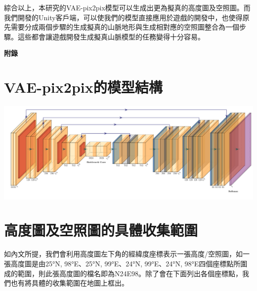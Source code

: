 \documentclass[a4paper, 12pt]{article}
\begin{document}
綜合以上，本研究的VAE-pix2pix模型可以生成出更為擬真的高度圖及空照圖。而我們開發的Unity客戶端，可以使我們的模型直接應用於遊戲的開發中，也使得原先需要分成兩個步驟的生成擬真的山脈地形與生成相對應的空照圖整合為一個步驟。這些都會讓遊戲開發生成擬真山脈模型的任務變得十分容易。

\nocite{*}
\printbibliography[title={參考文獻}]



\newpage
\begin{appendices}

    \begin{center}
        \Huge \textbf{附錄}
    \end{center}

    \section{VAE-pix2pix的模型結構}
    \begin{center}
        \includegraphics[width=\textwidth]{fig/Unet.pdf}
    \end{center}

    \section{高度圖及空照圖的具體收集範圍}
    如內文所提，我們會利用高度圖左下角的經緯度座標表示一張高度/空照圖，如一張高度圖是由25°N, 98°E、25°N, 99°E、24°N, 99°E、24°N, 98°E四個座標點所圍成的範圍，則此張高度圖的檔名即為N24E98。除了會在下面列出各個座標點，我們也有將具體的收集範圍在地圖上框出。


\end{appendices}
\end{document}
